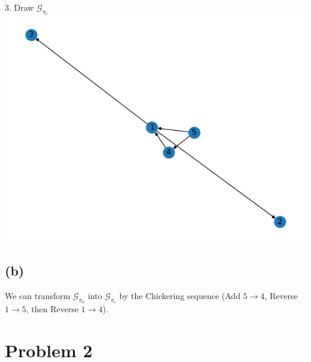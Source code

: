 \documentclass[10pt]{article}
\begin{document}
3. Draw $\mathcal{G}_{\pi_c}$\\

\includegraphics{images/pb1c.png}

\subsection{(b)}
We can transform  $\mathcal{G}_{\pi_a}$ into $\mathcal{G}_{\pi_c}$ by the Chickering sequence (Add $5 \rightarrow 4$, Reverse $1\rightarrow 5$, then Reverse $1\rightarrow 4$).

\section{Problem 2}
\end{document}
